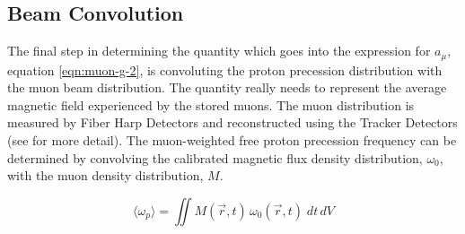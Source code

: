 \subsection{Beam Convolution}

The final step in determining the quantity which goes into the expression for $a_\mu$, equation \ref{eqn:muon-g-2}, is convoluting the proton precession distribution with the muon beam distribution.  The quantity really needs to represent the average magnetic field experienced by the stored muons.  The muon distribution is measured by Fiber Harp Detectors and reconstructed using the Tracker Detectors (see \cite{e989-tdr} for more detail).  The muon-weighted free proton precession frequency can be determined by convolving the calibrated magnetic flux density distribution, $\omega_0$, with the muon density distribution, $M$.

\begin{equation}
\label{eqn:field-omega-p-avg}
\langle \omega_p \rangle = \iint M(\vec{r}, t) \, \omega_0(\vec{r}, t)\; dt\,dV
\end{equation}
